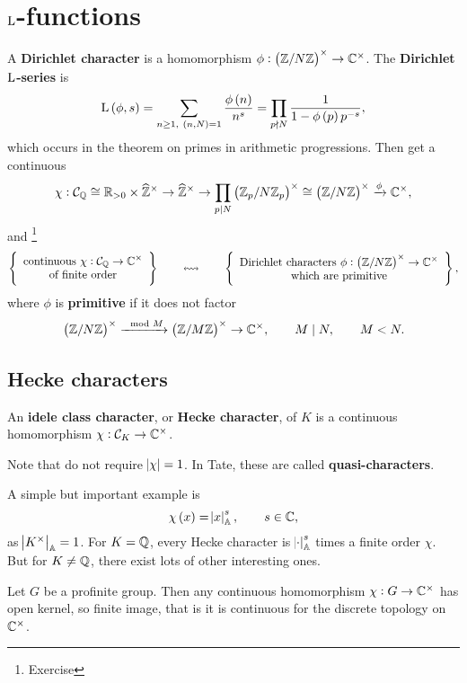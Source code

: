 \pagebreak

\section{\texorpdfstring{$ \mathrm{L} $}{L}-functions}

\begin{example*}
A \textbf{Dirichlet character} is a homomorphism $ \phi : \br{\ZZ / N\ZZ}^\times \to \CC^\times $. The \textbf{Dirichlet $ \mathrm{L} $-series} is
$$ \L\br{\phi, s} = \sum_{n \ge 1, \ \br{n, N} = 1} \dfrac{\phi\br{n}}{n^s} = \prod_{p \nmid N} \dfrac{1}{1 - \phi\br{p}p^{-s}}, $$
which occurs in the theorem on primes in arithmetic progressions. Then get a continuous
$$ \chi : \CCC_\QQ \cong \RR_{> 0} \times \widehat{\ZZ}^\times \to \widehat{\ZZ}^\times \to \prod_{p \mid N} \br{\ZZ_p / N\ZZ_p}^\times \cong \br{\ZZ / N\ZZ}^\times \xrightarrow{\phi} \CC^\times, $$
and \footnote{Exercise}
$$ \correspondence{\text{continuous} \ \chi : \CCC_\QQ \to \CC^\times \\ \text{of finite order}}{\text{Dirichlet characters} \ \phi : \br{\ZZ / N\ZZ}^\times \to \CC^\times \\ \text{which are primitive}}, $$
where $ \phi $ is \textbf{primitive} if it does not factor
$$ \br{\ZZ / N\ZZ}^\times \xrightarrow{\mod M} \br{\ZZ / M\ZZ}^\times \to \CC^\times, \qquad M \mid N, \qquad M < N. $$
\end{example*}

\subsection{Hecke characters}

\begin{definition*}
An \textbf{idele class character}, or \textbf{Hecke character}, of $ K $ is a continuous homomorphism $ \chi : \mathcal{C}_K \to \mathbb{C}^\times $.
\end{definition*}

Note that do not require $ \abs{\chi} = 1 $. In Tate, these are called \textbf{quasi-characters}.

\begin{example*}
A simple but important example is
$$ \chi\br{x} = \abs{x}_\AA^s, \qquad s \in \CC, $$
as $ \abs{K^\times}_{\mathbb{A}} = 1 $. For $ K = \mathbb{Q} $, every Hecke character is $ \abs{\cdot}_{\mathbb{A}}^s $ times a finite order $ \chi $. But for $ K \ne \mathbb{Q} $, there exist lots of other interesting ones.
\end{example*}

\begin{proposition}
\label{prop:10.1}
Let $ G $ be a profinite group. Then any continuous homomorphism $ \chi : G \to \mathbb{C}^\times $ has open kernel, so finite image, that is it is continuous for the discrete topology on $ \mathbb{C}^\times $.
\end{proposition}

